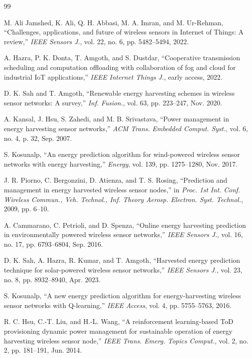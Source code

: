 \documentclass[journal]{IEEEtran}
\begin{document}
\balance
\begin{thebibliography}{99}

M. Ali Jamshed, K. Ali, Q. H. Abbasi, M. A. Imran, and M. Ur-Rehman, ``Challenges, applications, and future of wireless sensors in Internet of Things: A review,'' \textit{IEEE Sensors J.}, vol. 22, no. 6, pp. 5482--5494, 2022.

A. Hazra, P. K. Donta, T. Amgoth, and S. Dustdar, ``Cooperative transmission scheduling and computation offloading with collaboration of fog and cloud for industrial IoT applications,'' \textit{IEEE Internet Things J.}, early access, 2022.

D. K. Sah and T. Amgoth, ``Renewable energy harvesting schemes in wireless sensor networks: A survey,'' \textit {Inf. Fusion.}, vol. 63, pp. 223--247, Nov. 2020.

A. Kansal, J. Hsu, S. Zahedi, and M. B. Srivastava, ``Power management in energy harvesting sensor networks,'' \textit{ACM Trans. Embedded Comput. Syst.}, vol. 6, no. 4, p. 32, Sep. 2007.

S. Kosunalp, ``An energy prediction algorithm for wind-powered wireless sensor networks with energy harvesting,'' \textit{Energy}, vol. 139, pp. 1275--1280, Nov. 2017.

J. R. Piorno, C. Bergonzini, D. Atienza, and T. S. Rosing, ``Prediction and management in energy harvested wireless sensor nodes,'' in \textit{Proc. 1st Int. Conf. Wireless Commun., Veh. Technol., Inf. Theory Aerosp. Electron. Syst. Technol.}, 2009, pp. 6--10.

A. Cammarano, C. Petrioli, and D. Spenza, ``Online energy harvesting prediction in environmentally powered wireless sensor networks,'' \textit{IEEE Sensors J.}, vol. 16, no. 17, pp. 6793--6804, Sep. 2016.

D. K. Sah, A. Hazra, R. Kumar, and T. Amgoth, ``Harvested energy prediction technique for solar-powered wireless sensor networks,'' \textit{IEEE Sensors J.}, vol. 23, no. 8, pp. 8932--8940, Apr. 2023.

S. Kosunalp, ``A new energy prediction algorithm for energy-harvesting wireless sensor networks with Q-learning,'' \textit{IEEE Access}, vol. 4, pp. 5755--5763, 2016.

R. C. Hsu, C.-T. Liu, and H.-L. Wang, ``A reinforcement learning-based ToD provisioning dynamic power management for sustainable operation of energy harvesting wireless sensor node,'' \textit{IEEE Trans. Emerg. Topics Comput.}, vol. 2, no. 2, pp. 181--191, Jun. 2014.


\end{thebibliography}
\end{document}
